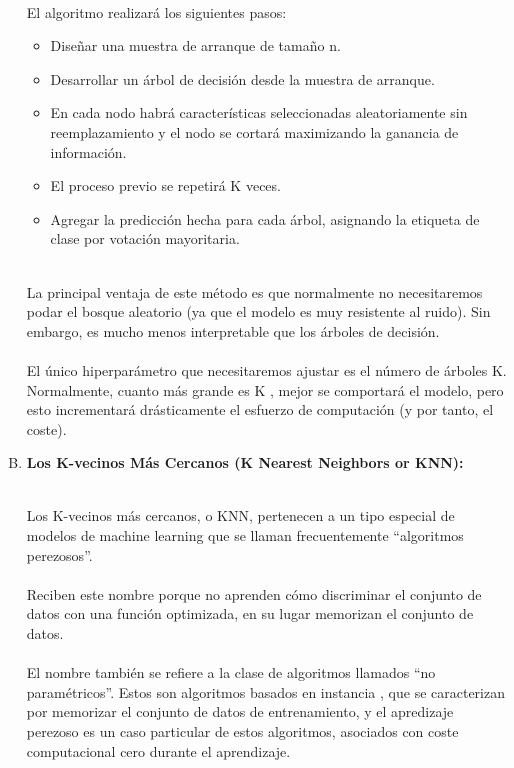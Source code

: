 \documentclass[11pt,a4paper]{article}
\begin{document}
\begin{enumerate}[A.]
            \\El algoritmo realizará los siguientes pasos:\\

            \begin{itemize}
			    \item Diseñar una muestra de arranque de tamaño n.
			    \item Desarrollar un árbol de decisión desde la muestra de arranque.
			    \item En cada nodo habrá características seleccionadas aleatoriamente sin reemplazamiento y el nodo se cortará maximizando la ganancia de información.
			    \item El proceso previo se repetirá K veces.
			    \item Agregar la predicción hecha para cada árbol, asignando la etiqueta de clase por votación mayoritaria.
		    \end{itemize}

            \\La principal ventaja de este método es que normalmente no necesitaremos podar el bosque aleatorio (ya que el modelo es muy resistente al ruido). Sin embargo, es mucho menos interpretable que los árboles de decisión.\\

            \\El único hiperparámetro que necesitaremos ajustar es el número de árboles K. Normalmente, cuanto más grande es K , mejor se comportará el modelo, pero esto incrementará drásticamente el esfuerzo de computación (y por tanto, el coste).\\

            \item \textbf{Los K-vecinos Más Cercanos (K Nearest Neighbors or KNN):}
            
            \\Los K-vecinos más cercanos, o KNN, pertenecen a un tipo especial de modelos de machine learning que se llaman frecuentemente “algoritmos perezosos”.\\

            \\Reciben este nombre porque no aprenden cómo discriminar el conjunto de datos con una función optimizada, en su lugar memorizan el conjunto de datos.\\
            
            \\El nombre también se refiere a la clase de algoritmos llamados “no paramétricos”. Estos son algoritmos basados en instancia , que se caracterizan por memorizar el conjunto de datos de entrenamiento, y el apredizaje perezoso es un caso particular de estos algoritmos, asociados con coste computacional cero durante el aprendizaje.\\


\end{enumerate}
\end{document}

